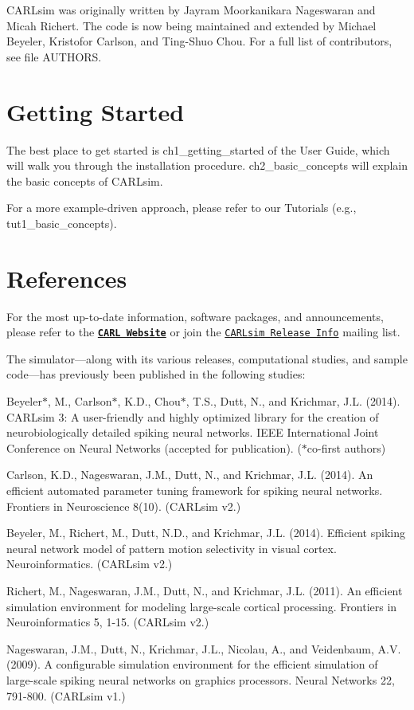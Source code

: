 C\+A\+R\+Lsim was originally written by Jayram Moorkanikara Nageswaran and Micah Richert. The code is now being maintained and extended by Michael Beyeler, Kristofor Carlson, and Ting-\/\+Shuo Chou. For a full list of contributors, see file A\+U\+T\+H\+O\+RS.\hypertarget{index_main_getting_started}{}\section{Getting Started}\label{index_main_getting_started}
The best place to get started is ch1\+\_\+getting\+\_\+started of the User Guide, which will walk you through the installation procedure. ch2\+\_\+basic\+\_\+concepts will explain the basic concepts of C\+A\+R\+Lsim.

For a more example-\/driven approach, please refer to our Tutorials (e.\+g., tut1\+\_\+basic\+\_\+concepts).\hypertarget{index_main_ref}{}\section{References}\label{index_main_ref}
For the most up-\/to-\/date information, software packages, and announcements, please refer to the \href{http://www.socsci.uci.edu/~jkrichma/CARLsim/index.html}{\tt {\bfseries C\+A\+RL Website}} or join the \href{https://department-lists.uci.edu/mailman/listinfo/ics-carlsim}{\tt C\+A\+R\+Lsim Release Info} mailing list.

The simulator—along with its various releases, computational studies, and sample code—has previously been published in the following studies\+:
\begin{DoxyItemize}
\item Beyeler$\ast$, M., Carlson$\ast$, K.\+D., Chou$\ast$, T.\+S., Dutt, N., and Krichmar, J.\+L. (2014). C\+A\+R\+Lsim 3\+: A user-\/friendly and highly optimized library for the creation of neurobiologically detailed spiking neural networks. I\+E\+EE International Joint Conference on Neural Networks (accepted for publication). ($\ast$co-\/first authors)
\item Carlson, K.\+D., Nageswaran, J.\+M., Dutt, N., and Krichmar, J.\+L. (2014). An efficient automated parameter tuning framework for spiking neural networks. Frontiers in Neuroscience 8(10). (C\+A\+R\+Lsim v2.)
\item Beyeler, M., Richert, M., Dutt, N.\+D., and Krichmar, J.\+L. (2014). Efficient spiking neural network model of pattern motion selectivity in visual cortex. Neuroinformatics. (C\+A\+R\+Lsim v2.)
\item Richert, M., Nageswaran, J.\+M., Dutt, N., and Krichmar, J.\+L. (2011). An efficient simulation environment for modeling large-\/scale cortical processing. Frontiers in Neuroinformatics 5, 1-\/15. (C\+A\+R\+Lsim v2.)
\item Nageswaran, J.\+M., Dutt, N., Krichmar, J.\+L., Nicolau, A., and Veidenbaum, A.\+V. (2009). A configurable simulation environment for the efficient simulation of large-\/scale spiking neural networks on graphics processors. Neural Networks 22, 791-\/800. (C\+A\+R\+Lsim v1.) 
\end{DoxyItemize}